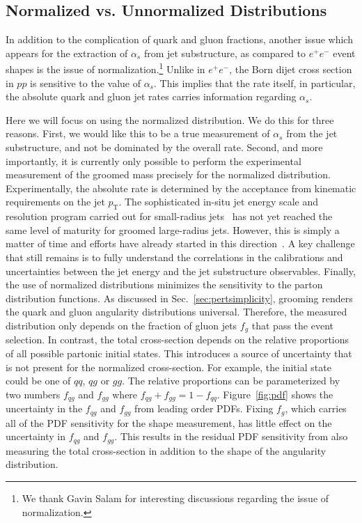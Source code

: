 \subsection{Normalized vs. Unnormalized Distributions}

In addition to the complication of quark and gluon fractions, another issue which appears for the extraction of $\alpha_s$ from jet substructure, as compared to $e^+e^-$ event shapes is the issue of normalization.\footnote{We thank Gavin Salam for interesting discussions regarding the issue of normalization.} Unlike in $e^+e^-$, the Born dijet cross section in $pp$ is sensitive to the value of $\alpha_s$. This implies that the rate itself, in particular, the absolute quark and gluon jet rates carries information regarding $\alpha_s$. 

Here we will focus on using the normalized distribution. We do this for three reasons. First, we would like this to be a true measurement of $\alpha_s$ from the jet substructure, and not be dominated by the overall rate. Second, and more importantly, it is currently only possible to perform the experimental measurement of the groomed mass precisely for the normalized distribution.  Experimentally, the absolute rate is determined by the acceptance from kinematic requirements on the jet $p_\text{T}$.  The sophisticated in-situ jet energy scale and resolution program carried out for small-radius jets~\cite{Aad:2014bia,Aaboud:2017jcu,Khachatryan:2016kdb,CMS-DP-2016-020} has not yet reached the same level of maturity for groomed large-radius jets.  However, this is simply a matter of time and efforts have already started in this direction~\cite{ATLAS-CONF-2017-063}.  A key challenge that still remains is to fully understand the correlations in the calibrations and uncertainties between the jet energy and the jet substructure observables.  Finally, the use of normalized distributions minimizes the sensitivity to the parton distribution functions.  As discussed in Sec.~\ref{sec:pertsimplicity}, grooming renders the quark and gluon angularity distributions universal.  Therefore, the measured distribution only depends on the fraction of gluon jets $f_g$ that pass the event selection.  In contrast, the total cross-section depends on the relative proportions of all possible partonic initial states.  This introduces a source of uncertainty that is not present for the normalized cross-section.  For example, the initial state could be one of $qq$, $qg$ or $gg$.  The relative proportions can be parameterized by two numbers $f_{qg}$ and $f_{gg}$ where $f_{qg}+f_{gg}=1-f_{qq}$.   Figure~\ref{fig:pdf} shows the uncertainty in the $f_{qg}$ and $f_{gg}$ from leading order PDFs.  Fixing $f_g$, which carries all of the PDF sensitivity for the shape measurement, has little effect on the uncertainty in $f_{qg}$ and $f_{gg}$.  This results in the residual PDF sensitivity from also measuring the total cross-section in addition to the shape of the angularity distribution.





